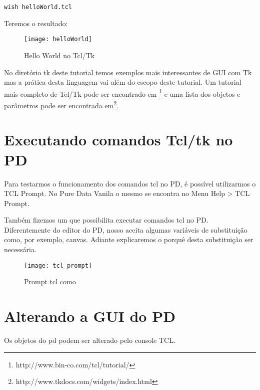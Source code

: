 \begin{lstlisting}[caption=Executando o Hello World]
wish helloWorld.tcl
\end{lstlisting}

Teremos o resultado:
\begin{figure}[ht!]
	\centering
	\texttt{[image: helloWorld]}
	\caption{Hello World no Tcl/Tk}
\end{figure}

No diretório tk deste tutorial temos exemplos mais interessantes de GUI com Tk
mas a prática desta linguagem vai além do escopo deste tutorial.
Um tutorial mais completo de Tcl/Tk pode ser encontrado em 
\footnote{http://www.bin-co.com/tcl/tutorial/} e uma lista dos objetos e
parâmetros pode ser encontrada em\footnote{http://www.tkdocs.com/widgets/index.html}.

\section{Executando comandos Tcl/tk no PD}

Para testarmos o funcionamento dos comandos tcl no PD, é possível utilizarmos o
TCL Prompt.
No Pure Data Vanila o mesmo se encontra no Menu Help > TCL Prompt.

Também fizemos um \external que possibilita executar comandos tcl no PD.
Diferentemente do editor do PD, nosso \external aceita algumas variáveis
de substituição como, por exemplo, canvas.
Adiante explicaremos o porquê desta substituição ser necessária.

\begin{figure}[ht!]
	\centering
	\texttt{[image: tcl\_prompt]}
	\caption{Prompt tcl como \external}
\end{figure}

\section{Alterando a GUI do PD}
Os objetos do pd podem ser alterado pelo console TCL.


